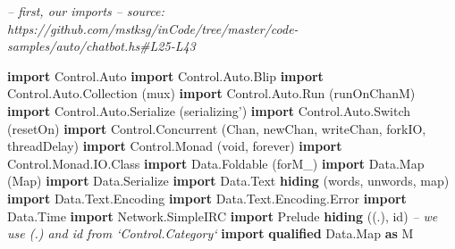\documentclass[]{article}
\newenvironment{Shaded}{}{}
\newcommand{\CommentTok}[1]{\textcolor[rgb]{0.38,0.63,0.69}{\textit{#1}}}
\newcommand{\DataTypeTok}[1]{\textcolor[rgb]{0.56,0.13,0.00}{#1}}
\newcommand{\KeywordTok}[1]{\textcolor[rgb]{0.00,0.44,0.13}{\textbf{#1}}}
\newcommand{\NormalTok}[1]{#1}
\begin{document}
\begin{Shaded}
\begin{Highlighting}[]
\CommentTok{-- first, our imports}
\CommentTok{-- source: https://github.com/mstksg/inCode/tree/master/code-samples/auto/chatbot.hs#L25-L43}

\KeywordTok{import} \DataTypeTok{Control.Auto}
\KeywordTok{import} \DataTypeTok{Control.Auto.Blip}
\KeywordTok{import} \DataTypeTok{Control.Auto.Collection}\NormalTok{  (mux)}
\KeywordTok{import} \DataTypeTok{Control.Auto.Run}\NormalTok{         (runOnChanM)}
\KeywordTok{import} \DataTypeTok{Control.Auto.Serialize}\NormalTok{   (serializing')}
\KeywordTok{import} \DataTypeTok{Control.Auto.Switch}\NormalTok{      (resetOn)}
\KeywordTok{import} \DataTypeTok{Control.Concurrent}\NormalTok{       (}\DataTypeTok{Chan}\NormalTok{, newChan, writeChan, forkIO, threadDelay)}
\KeywordTok{import} \DataTypeTok{Control.Monad}\NormalTok{            (void, forever)}
\KeywordTok{import} \DataTypeTok{Control.Monad.IO.Class}
\KeywordTok{import} \DataTypeTok{Data.Foldable}\NormalTok{            (forM_)}
\KeywordTok{import} \DataTypeTok{Data.Map}\NormalTok{                 (}\DataTypeTok{Map}\NormalTok{)}
\KeywordTok{import} \DataTypeTok{Data.Serialize}
\KeywordTok{import} \DataTypeTok{Data.Text} \KeywordTok{hiding}\NormalTok{         (words, unwords, map)}
\KeywordTok{import} \DataTypeTok{Data.Text.Encoding}
\KeywordTok{import} \DataTypeTok{Data.Text.Encoding.Error}
\KeywordTok{import} \DataTypeTok{Data.Time}
\KeywordTok{import} \DataTypeTok{Network.SimpleIRC}
\KeywordTok{import} \DataTypeTok{Prelude} \KeywordTok{hiding}\NormalTok{           ((.), id)   }\CommentTok{-- we use (.) and id from `Control.Category`}
\KeywordTok{import} \KeywordTok{qualified} \DataTypeTok{Data.Map}       \KeywordTok{as} \DataTypeTok{M}
\end{Highlighting}
\end{Shaded}
\end{document}
